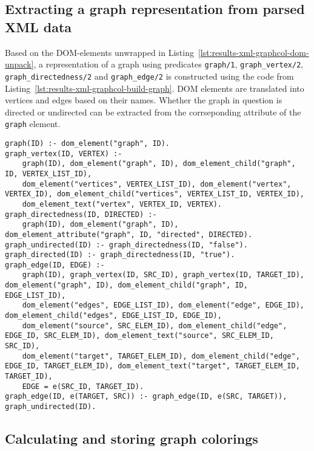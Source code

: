\subsection{Extracting a graph representation from parsed XML data}
\label{subsec:results-xml-extract-graph}

Based on the DOM-elements unwrapped in Listing~\ref{lst:results-xml-graphcol-dom-unpack}, a representation of a graph using predicates \texttt{graph/1}, \texttt{graph\_vertex/2}, \texttt{graph\_directedness/2} and \texttt{graph\_edge/2} is constructed using the code from Listing~\ref{lst:results-xml-graphcol-build-graph}. DOM elements are translated into vertices and edges based on their names. Whether the graph in question is directed or undirected can be extracted from the corrseponding attribute of the \texttt{graph} element.

\begin{lstlisting}[style=asp-code, label={lst:results-xml-graphcol-build-graph}, caption={Constructing a graph representation from parsed XML data.}]
% Translate generic DOM-elements into graphs
graph(ID) :- dom_element("graph", ID).
graph_vertex(ID, VERTEX) :- 
    graph(ID), dom_element("graph", ID), dom_element_child("graph", ID, VERTEX_LIST_ID), 
    dom_element("vertices", VERTEX_LIST_ID), dom_element("vertex", VERTEX_ID), dom_element_child("vertices", VERTEX_LIST_ID, VERTEX_ID),
    dom_element_text("vertex", VERTEX_ID, VERTEX).
graph_directedness(ID, DIRECTED) :- 
    graph(ID), dom_element("graph", ID), dom_element_attribute("graph", ID, "directed", DIRECTED).
graph_undirected(ID) :- graph_directedness(ID, "false").
graph_directed(ID) :- graph_directedness(ID, "true").
graph_edge(ID, EDGE) :- 
    graph(ID), graph_vertex(ID, SRC_ID), graph_vertex(ID, TARGET_ID), dom_element("graph", ID), dom_element_child("graph", ID, EDGE_LIST_ID), 
    dom_element("edges", EDGE_LIST_ID), dom_element("edge", EDGE_ID), dom_element_child("edges", EDGE_LIST_ID, EDGE_ID),
    dom_element("source", SRC_ELEM_ID), dom_element_child("edge", EDGE_ID, SRC_ELEM_ID), dom_element_text("source", SRC_ELEM_ID, SRC_ID),
    dom_element("target", TARGET_ELEM_ID), dom_element_child("edge", EDGE_ID, TARGET_ELEM_ID), dom_element_text("target", TARGET_ELEM_ID, TARGET_ID),
    EDGE = e(SRC_ID, TARGET_ID).
graph_edge(ID, e(TARGET, SRC)) :- graph_edge(ID, e(SRC, TARGET)), graph_undirected(ID).	    
\end{lstlisting}    

\subsection{Calculating and storing graph colorings}

